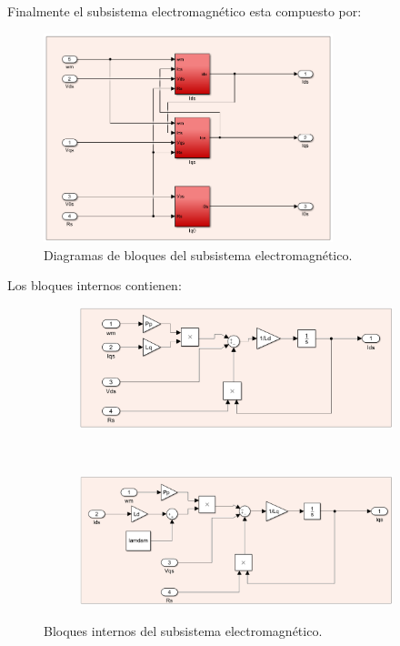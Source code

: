 \documentclass{article}
\begin{document}
Finalmente el subsistema electromagnético esta compuesto por:

\begin{figure}[H]
    \centering
    \includegraphics[width=0.75\textwidth]{sub_electromagentico.png}
    \caption{Diagramas de bloques del subsistema electromagnético.}
\end{figure}

Los bloques internos contienen:

\begin{figure}[H]
    \centering
    \begin{subfigure}[]{0.75\textwidth}
        \centering
        \includegraphics[width=1\textwidth]{sub_electromagentico4.png}
    \end{subfigure}
    \\
    \begin{subfigure}[b]{0.75\textwidth}
        \centering
        \includegraphics[width=1\textwidth]{sub_electromagentico3.png}
    \end{subfigure}
    \caption{Bloques internos del subsistema electromagnético.}
\end{figure}
\end{document}
